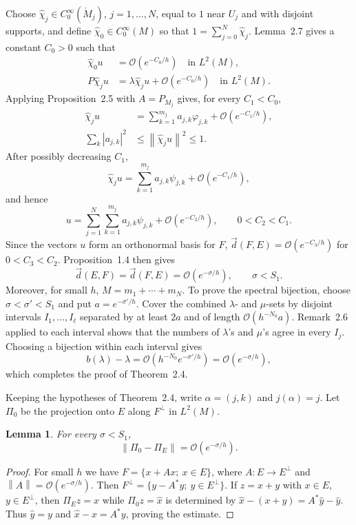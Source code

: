 \documentclass[11pt,a4paper]{article}
\newcommand{\cO}{\mathcal O}
\newcommand{\norm}[1]{\left\lVert #1\right\rVert}
\newcommand{\dvec}{\overset{\rightarrow}{d}}
\numberwithin{equation}{section}
\newtheorem{lemma}[theorem]{Lemma}
\theoremstyle{remark}
\begin{document}
Choose $\widehat\chi_j\in C_0^\infty(\mathring M_j)$, $j=1,\ldots,N$, equal to $1$ near $U_j$ and with disjoint supports, and define $\widehat\chi_0\in C_0^\infty(M)$ so that $1=\sum_{j=0}^N\widehat\chi_j$. Lemma~2.7 gives a constant $C_0>0$ such that
\begin{align}
\widehat\chi_0u&=\cO(e^{-C_0/h})\quad\text{in }L^2(M),\tag{2.12}\\
P\widehat\chi_ju&=\lambda\widehat\chi_ju+\cO(e^{-C_0/h})\quad\text{in }L^2(M).\tag{2.13}
\end{align}
Applying Proposition~2.5 with $A=P_{M_j}$ gives, for every $C_1<C_0$,
\begin{align}
\widehat\chi_ju&=\sum_{k=1}^{m_j}a_{j,k}\varphi_{j,k}+\cO(e^{-C_1/h}),\tag{2.14}\\
\sum_k|a_{j,k}|^2&\le\norm{\widehat\chi_ju}^2\le1.\tag{2.15}
\end{align}
After possibly decreasing $C_1$,
\begin{equation}
\widehat\chi_ju=\sum_{k=1}^{m_j}a_{j,k}\psi_{j,k}+\cO(e^{-C_1/h}),
\tag{2.16}
\end{equation}
and hence
\begin{equation}
u=\sum_{j=1}^N\sum_{k=1}^{m_j}a_{j,k}\psi_{j,k}+\cO(e^{-C_2/h}),\qquad0<C_2<C_1.
\tag{2.17}
\end{equation}
Since the vectors $u$ form an orthonormal basis for $F$, $\dvec(F,E)=\cO(e^{-C_3/h})$ for $0<C_3<C_2$. Proposition~1.4 then gives
\[
\dvec(E,F)=\dvec(F,E)=\cO(e^{-\sigma/h}),\qquad \sigma<S_1.
\]
Moreover, for small $h$, $M=m_1+\cdots+m_N$. To prove the spectral bijection, choose $\sigma<\sigma'<S_1$ and put $a=e^{-\sigma'/h}$. Cover the combined $\lambda$- and $\mu$-sets by disjoint intervals $I_1,\ldots,I_\ell$ separated by at least $2a$ and of length $\cO(h^{-N_0}a)$. Remark~2.6 applied to each interval shows that the numbers of $\lambda$'s and $\mu$'s agree in every $I_j$. Choosing a bijection within each interval gives
\[
b(\lambda)-\lambda=\cO(h^{-N_0}e^{-\sigma'/h})=\cO(e^{-\sigma/h}),
\]
which completes the proof of Theorem~2.4.

Keeping the hypotheses of Theorem~2.4, write $\alpha=(j,k)$ and $j(\alpha)=j$. Let $\Pi_0$ be the projection onto $E$ along $F^\perp$ in $L^2(M)$.

\begin{lemma}
For every $\sigma<S_1$,
\[
\norm{\Pi_0-\Pi_E}=\cO(e^{-\sigma/h}).
\]
\end{lemma}
\begin{proof}
For small $h$ we have $F=\{x+Ax;\ x\in E\}$, where $A:E\to E^\perp$ and $\norm A=\cO(e^{-\sigma/h})$. Then $F^\perp=\{y-A^*y;\ y\in E^\perp\}$. If $z=x+y$ with $x\in E$, $y\in E^\perp$, then $\Pi_Ez=x$ while $\Pi_0z=\widehat x$ is determined by $\widehat x-(x+y)=A^*\widehat y-\widehat y$. Thus $\widehat y=y$ and $\widehat x-x=A^*y$, proving the estimate.
\end{proof}
\end{document}

